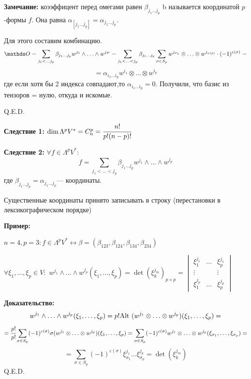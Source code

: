 \textbf{Замечание:} коээффицент перед омегами равен $\beta_{j_1\ldots j_p}$ b называется  координатой $p$-формы $f$.  Она равна $\alpha_{[j_1\ldots j_p]}=\alpha_{j_1\ldots j_p}$. 


Для этого составим комбинацию. 
$$\zero=\sum\limits_{j_1 <\ldots j_p}\beta_{j_1\ldots j_p} w^{j_1}\wedge \ldots \wedge w^{j_P}= 
\sum\limits_{j_1 < \ldots <j_p} \beta_{j_1\ldots j_p}\sum_{\sigma \in S_p} w^{j_{\sigma_1}}\otimes\ldots\otimes w^{j_{\sigma(p)}} \cdot (-1)^{\varepsilon(\sigma)} = $$
$$= \alpha_{i_1\ldots i_p} w^{i_1}\otimes \ldots \otimes w^{i_p}$$
где если хотя бы 2 индекса совпадают,то $\alpha_{i_1\ldots i_p} = 0$. Получили, что базис из тензоров = нулю, откуда и искомые.

\hfill Q.E.D.

\textbf{Следствие 1:} $\dim \Lambda^pV^* = C^p_n = \cfrac{n!}{p!(n-p)!}$

\textbf{Следствие 2:} $\forall f \in \Lambda^p V^*:$
$$f = \sum\limits_{j_1<\ldots <j_p} \beta_{j_1\ldots j_p}w^{j_1}\wedge \ldots \wedge w^{j_p}$$
где $\beta_{j_1\ldots j_p} = \alpha_{j_1\ldots j_p}$--- 
 координаты.

Существенные координаты принято записывать в строку
(перестановки в лексикографическом порядке)

\textbf{Пример:}

$n=4, p=3: f\in \Lambda^{p}V^* \leftrightarrow \beta = (\beta_{123},\beta_{124},\beta_{134}, \beta_{234})$


$\forall \xi_1,\ldots, \xi_p \in V:$ $w^{j_1}\wedge \ldots \wedge w^{j_p} (\xi_1,\ldots,\xi_p) = \det(\xi^{j_m}_k)_{p\times p} = \begin{vmatrix}
    \xi_1^{j_1} & \ldots & \xi_p^{j_1}\\
    \vdots & & \vdots \\
    \xi_1^{j_p} & \ldots & \xi_p^{j_p}
\end{vmatrix}$

\textbf{Доказательство:}
$$w^{j_1}\wedge \ldots \wedge w^{j_p} (\xi_1,\ldots,\xi_p) = p! \text{Alt } (w^{j_1}\otimes \ldots  \otimes w^{j_p})(\xi_1,\ldots,\xi_p) =$$
$$=\cfrac{p!}{p!} \sum\limits_{\sigma \in S_p}(-1)^{\varepsilon(\sigma)}\sigma(w^{j_1}\otimes \ldots \otimes w^{j_p})(\xi_1,\ldots,\xi_p) = \sum_{\sigma \in S_p} (-1)^{\varepsilon(\sigma)}w^{j_1}\otimes \ldots \otimes w^{j_p}(\xi_{\sigma_1},\ldots ,\xi_{\sigma_p}) = $$
$$= \sum\limits_{\sigma\in S_p}(-1)^{\varepsilon(\sigma)}\xi_{\sigma_1}^{j_1}\ldots \xi_{\sigma_p}^{j_p} = \det(\xi_k^{j_m})$$
\hfill Q.E.D.


